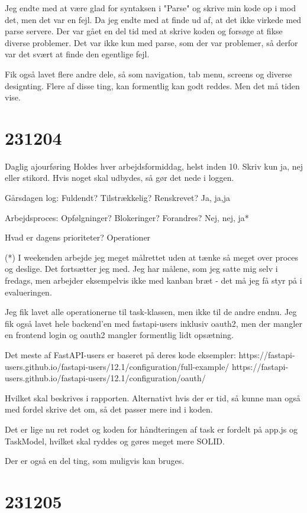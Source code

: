 \documentclass{report}
\begin{document}
Jeg endte med at være glad for syntaksen i "Parse" og skrive min kode op i mod det, men det var en fejl. Da jeg endte med at finde ud af, at det ikke virkede med parse servere.
Der var gået en del tid med at skrive koden og forsøge at fikse diverse problemer.
Det var ikke kun med parse, som der var problemer, så derfor var det svært at finde den egentlige fejl.
 
Fik også lavet flere andre dele, så som navigation, tab menu, screens og diverse designting. Flere af disse ting, kan formentlig kan godt reddes.
Men det må tiden vise.

\section{231204}
Daglig ajourføring
Holdes hver arbejdsformiddag, helst inden 10. Skriv kun ja, nej eller stikord. Hvis noget skal udbydes, så gør det nede i loggen.
 
Gårsdagen log: Fuldendt? Tilstrækkelig? Renskrevet?
Ja, ja,ja
 
Arbejdsproces: Opfølgninger? Blokeringer? Forandres?
Nej, nej, ja*
 
Hvad er dagens prioriteter?
Operationer
 
(*) I weekenden arbejde jeg meget målrettet uden at tænke så meget over proces og deslige. Det fortsætter jeg med. Jeg har målene, som jeg satte mig selv i fredags, men arbejder eksempelvis ikke med kanban bræt - det må jeg få styr på i evalueringen.
 
Jeg fik lavet alle operationerne til task-klassen, men ikke til de andre endnu.
Jeg fik også lavet hele backend'en med fastapi-users inklusiv oauth2, men der mangler en frontend login og oauth2 mangler formentlig lidt opsætning.
 
Det meste af FastAPI-users er baseret på deres kode eksempler:
https://fastapi-users.github.io/fastapi-users/12.1/configuration/full-example/
https://fastapi-users.github.io/fastapi-users/12.1/configuration/oauth/
 
Hvilket skal beskrives i rapporten.
Alternativt hvis der er tid, så kunne man også med fordel skrive det om, så det passer mere ind i koden.
 
Det er lige nu ret rodet og koden for håndteringen af task er fordelt på app.js og TaskModel, hvilket skal ryddes og gøres meget mere SOLID.
 
Der er også en del ting, som muligvis kan bruges.

\section{231205}
\end{document}
